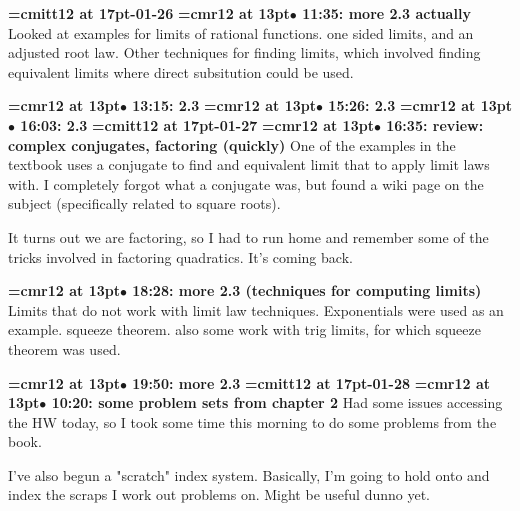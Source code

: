 {\medskip\noindent\bf\font\titlefont=cmitt12 at 17pt-01-26}\medskip
{\smallskip\noindent\bf\font\titlefont=cmr12 at 13pt\titlefont $\bullet$ 11:35: more 2.3 actually}\smallskip
Looked at examples for limits of rational functions. one sided limits, and an adjusted root law. Other techniques for finding limits, which involved finding equivalent limits where direct subsitution could be used.
\par

{\smallskip\noindent\bf\font\titlefont=cmr12 at 13pt\titlefont $\bullet$ 13:15: 2.3}\smallskip
{\smallskip\noindent\bf\font\titlefont=cmr12 at 13pt\titlefont $\bullet$ 15:26: 2.3}\smallskip
{\smallskip\noindent\bf\font\titlefont=cmr12 at 13pt\titlefont $\bullet$ 16:03: 2.3}\smallskip
{\medskip\noindent\bf\font\titlefont=cmitt12 at 17pt-01-27}\medskip
{\smallskip\noindent\bf\font\titlefont=cmr12 at 13pt\titlefont $\bullet$ 16:35: review: complex conjugates, factoring (quickly)}\smallskip
One of the examples in the textbook uses a conjugate to find and equivalent limit that to apply limit laws with. I completely forgot what a conjugate was, but found a wiki page on the subject (specifically related to square roots).
\par

It turns out we are factoring, so I had to run home and remember some of the tricks involved in factoring quadratics. It's coming back.
\par

{\smallskip\noindent\bf\font\titlefont=cmr12 at 13pt\titlefont $\bullet$ 18:28: more 2.3 (techniques for computing limits)}\smallskip
Limits that do not work with limit law techniques. Exponentials were used as an example. squeeze theorem. also some work with trig limits, for which squeeze theorem was used.
\par

{\smallskip\noindent\bf\font\titlefont=cmr12 at 13pt\titlefont $\bullet$ 19:50: more 2.3}\smallskip
{\medskip\noindent\bf\font\titlefont=cmitt12 at 17pt-01-28}\medskip
{\smallskip\noindent\bf\font\titlefont=cmr12 at 13pt\titlefont $\bullet$ 10:20: some problem sets from chapter 2}\smallskip
Had some issues accessing the HW today, so I took some time this morning to do some problems from the book.
\par

I've also begun a "scratch" index system. Basically, I'm going to hold onto and index the scraps I work out problems on. Might be useful dunno yet.
\par

